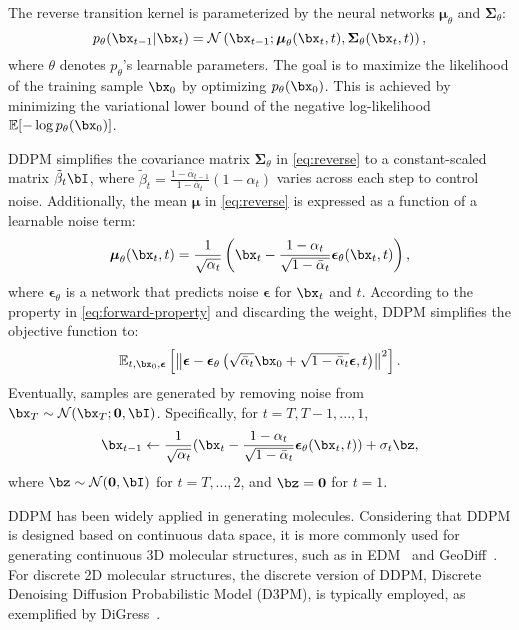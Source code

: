 The reverse transition kernel is parameterized by the neural networks $\boldsymbol{\mu}_{\theta}$ and $\mathbf{\Sigma}_{\theta}$:
\begin{equation}
p_\theta(\bx_{t-1}|\bx_t) = \mathcal{N}\left(\bx_{t-1}; \boldsymbol{\mu}_\theta(\bx_t, t), \mathbf{\Sigma}_\theta(\bx_t, t)\right),
\label{eq:reverse}
\end{equation}
where $\theta$ denotes $p_{\theta}$'s learnable parameters. 
The goal is to maximize the likelihood of the training sample $\bx_0$ by optimizing $p_\theta(\bx_0)$. This is achieved by minimizing the variational lower bound of the negative log-likelihood $\mathbb{E}[-\log p_\theta(\bx_0)]$.

DDPM simplifies the covariance matrix $\mathbf{\Sigma}_\theta$ in \cref{eq:reverse} to a constant-scaled matrix $\tilde{\beta}_t \bI$, where $\tilde{\beta}_t=\frac{1-\bar{\alpha}_{t-1}}{1-\bar{\alpha}_t}(1-\alpha_t)$ varies across each step to control noise. Additionally, the mean $\boldsymbol{\mu}$ in \cref{eq:reverse} is expressed as a function of a learnable noise term:
\begin{equation}
\boldsymbol{\mu}_\theta(\bx_t, t) = \frac{1}{\sqrt{\alpha_t}} \left(\bx_t - \frac{1-\alpha_t}{\sqrt{1-\bar{\alpha}_t}} \boldsymbol{\epsilon}_\theta(\bx_t, t) \right),
\end{equation}
where $\boldsymbol{\epsilon}_\theta$ is a network that predicts noise $\boldsymbol{\epsilon}$ for $\bx_t$ and $t$.
According to the property in \cref{eq:forward-property} and discarding the weight, DDPM simplifies the objective function to:
\begin{equation}
\mathbb{E}_{t,\bx_0,\boldsymbol{\epsilon}} \left[\left\| \boldsymbol{\epsilon} - \boldsymbol{\epsilon}_\theta \left( \sqrt{\bar{\alpha}_t} \bx_0 + \sqrt{1 - \bar{\alpha}_t} \boldsymbol{\epsilon}, t \right) \right\|^2 \right].
\end{equation}
Eventually, samples are generated by removing noise from $\bx_T \sim \mathcal{N}(\bx_T; \mathbf{0}, \bI)$. Specifically, for $t = T, T-1, ..., 1$,
\begin{equation}
\bx_{t-1} \leftarrow \frac{1}{\sqrt{\alpha_{t}}} (\bx_{t} - \frac{1-\alpha_t}{\sqrt{1-\bar{\alpha}_t}} \boldsymbol{\epsilon}_\theta(\bx_{t}, t)) + \sigma_t \bz,
\end{equation}
where $\bz \sim \mathcal{N}(\mathbf{0}, \bI)$ for $t = T, ..., 2$, and $\bz = \mathbf{0}$ for $t = 1$.

DDPM has been widely applied in generating molecules. Considering that DDPM is designed based on continuous data space, it is more commonly used for generating continuous 3D molecular structures, such as in EDM~\citep{EDM} and GeoDiff~\citep{GeoDiff}. For discrete 2D molecular structures, the discrete version of DDPM, Discrete Denoising Diffusion Probabilistic Model (D3PM), is typically employed, as exemplified by DiGress~\citep{DiGress}.



